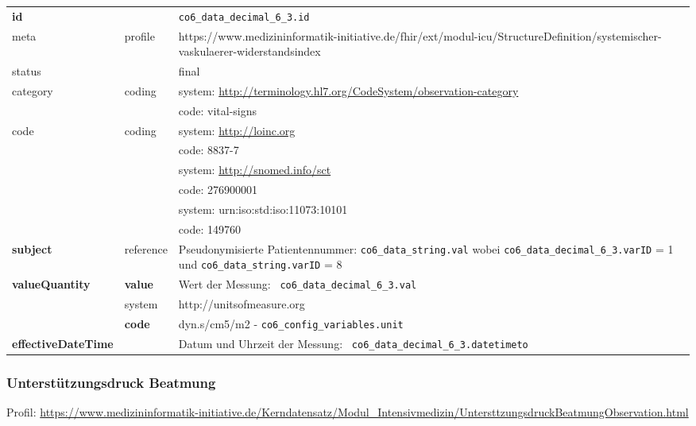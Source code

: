 \begin{longtable}{|l|l|p{7.5cm}|}
	\hline
	\rowcolor{lightgray} \multicolumn{3}{|l|}{Data Mapping (inhaltlich)} \\ \hline
	\textbf{id} &  & \texttt{co6\_data\_decimal\_6\_3.id} \\ \hline
	meta & profile & https://www.medizininformatik-initiative.de/fhir/ext/modul-icu/StructureDefinition/systemischer-vaskulaerer-widerstandsindex \\ \hline 
	status &  & final   \\ \hline 
	category & coding & system: \url{http://terminology.hl7.org/CodeSystem/observation-category} \\
	\cline{3-3}
	& & code: vital-signs \\ \hline
	code & coding & system: \url{http://loinc.org} \\ 
	\cline{3-3} 
	&  & code: 8837-7 \\ 
	\cline{3-3} 
	&  & system: \url{http://snomed.info/sct} \\ 
	\cline{3-3}
	&  & code: 276900001 \\ 
	\cline{3-3} 
	&  & system: urn:iso:std:iso:11073:10101 \\ 
	\cline{3-3}
	&  & code: 149760 \\ \hline
	\textbf{subject} & reference & Pseudonymisierte Patientennummer: \texttt{co6\_data\_string.val} wobei \texttt{co6\_data\_decimal\_6\_3.varID} = 1 und \texttt{co6\_data\_string.varID} = 8 \\ \hline
	\textbf{valueQuantity}  & \textbf{value} & Wert der Messung: \texttt{
		co6\_data\_decimal\_6\_3.val} \\
	\cline{2-3}
	& system & http://unitsofmeasure.org \\
	\cline{2-3}
	& \textbf{code} & dyn.s/cm5/m2 - \texttt{co6\_config\_variables.unit} \\ \hline
	\textbf{effectiveDateTime}  & & Datum und Uhrzeit der Messung: \texttt{
		co6\_data\_decimal\_6\_3.datetimeto} \\
	\hline
\end{longtable}

\subsubsection{Unterstützungsdruck Beatmung} 
Profil: \url{https://www.medizininformatik-initiative.de/Kerndatensatz/Modul_Intensivmedizin/UntersttzungsdruckBeatmungObservation.html}

